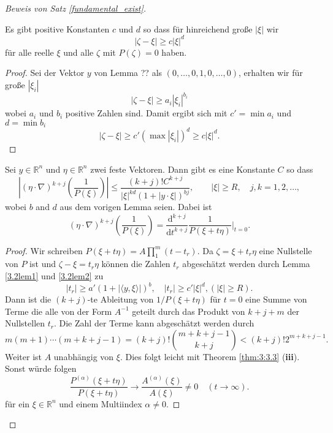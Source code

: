 \begin{proof}[Beweis von Satz \ref{fundamental_exist}]
\begin{lem}\label{3.2lem2}
Es gibt positive Konstanten $c$ und $d$ so dass für hinreichend große $|\xi|$ wir 
\begin{equation}
|\zeta- \xi|\ge c |\xi|^{d}
\end{equation} 
für alle reelle $\xi$ und alle $\zeta$ mit $P(\zeta)=0$ haben.
\end{lem} 
\begin{proof}
Sei der Vektor $y$ von Lemma ?? als $(0,\ldots, 0, 1, 0, \ldots, 0)$, erhalten wir für große $|\xi_i|$
\begin{equation}
|\zeta-\xi|\ge a_i |\xi_i|^{b_i}
\end{equation}
wobei $a_i$ und $b_i$ positive Zahlen sind. Damit ergibt sich mit $c'=\min a_i$ und $d=\min b_i$ 
\begin{equation}
|\zeta - \xi|\ge c'(\max |\xi_i|)^d \ge c |\xi|^d.
\end{equation}
\end{proof}
\begin{lem}\label{3.2lem3}
Sei $y\in \mathbb R^n$ und $\eta \in \mathbb R^n$ zwei feste Vektoren. Dann gibt es eine Konstante $C$ so dass
\begin{equation}
\left |(\eta\cdot\nabla)^{k+j} \left ( \frac{1}{P(\xi)} \right )  \right | \le \frac{(k+j)! C^{k+j}}{|\xi|^{kd} ( 1+ | y\cdot\xi | )^{bj}},\qquad  |\xi|\ge R, \quad j, k=1,2,\ldots,
\end{equation}
wobei $b$ and $d$ aus dem vorigen Lemma seien. Dabei ist
\begin{equation}
(\eta\cdot\nabla)^{k+j} \left (\frac{1}{P(\xi)} \right ) =  \frac{\mathrm d^{k+j}}{\mathrm d t^{k+j}}  \frac{1}{P(\xi+ t\eta)} \bigg|_{t=0}.
\end{equation}
\end{lem}
\begin{proof}
Wir schreiben $P(\xi+t\eta) = A \prod_{1}^m (t-t_r) $. Da $\zeta = \xi+ t_r \eta$ eine Nullstelle von $P$ ist und $\zeta - \xi = t_r \eta$ können die Zahlen $t_r$ abgeschätzt werden durch Lemma \ref{3.2lem1} und \ref{3.2lem2} zu
\begin{equation}\label{3.2tr}
|t_r| \ge a' (1+|\langle y, \xi\rangle|)^b,\quad |t_r|\ge c' |\xi|^d, (|\xi|\ge R).
\end{equation}
Dann ist die $(k+j)$-te  Ableitung von $1/P(\xi+t\eta)$ für $t=0$ eine Summe von Terme die alle von der Form $A^{-1}$ geteilt durch das Produkt von $k+j+m$ der Nullstellen $t_r$. Die Zahl der Terme kann abgeschätzt werden durch
\begin{equation}
m(m+1) \cdots (m+k+j-1) =(k+j)! \binom{m+k+j-1}{k+j}<(k+j)! 2^{m+k+j-1}.
\end{equation}
Weiter ist $A$ unabhängig von $\xi$. Dies folgt leicht mit Theorem \ref{thm:3:3.3} ({\bf iii}). Sonst würde folgen 
\begin{equation}
\frac{P^{(\alpha)}(\xi + t\eta)}{P(\xi + t\eta)}\to \frac{A^{(\alpha)}(\xi)}{A(\xi)}\neq 0\quad(t\to \infty).
\end{equation}
für ein $\xi\in \mathbb R^n$ und einem Multiindex $\alpha\neq 0$.


\end{proof}
\end{proof}

